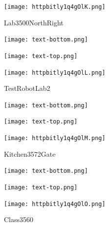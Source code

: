 \documentclass[letterpaper]{article}
\begin{document}
 \begingroup 
 \centerline{\texttt{[image: httpbitly1q4gOlK.png]}} 
 \endgroup 
 \vspace*{\fill} 

 \hfill{\small Lab3500NorthRight} 

  \vspace{0.7in} 
 
 \centerline{\texttt{[image: text-bottom.png]}} 
 
 \pagebreak 
{} 
 \vspace*{\fill} 
 
  \centerline{\texttt{[image: text-top.png]}} 
 
 \vspace{0.5in} 
 
 \begingroup 
 \centerline{\texttt{[image: httpbitly1q4gOlL.png]}} 
 \endgroup 
 \vspace*{\fill} 

 \hfill{\small TestRobotLab2} 

  \vspace{0.7in} 
 
 \centerline{\texttt{[image: text-bottom.png]}} 
 
 \pagebreak 
{} 
 \vspace*{\fill} 
 
  \centerline{\texttt{[image: text-top.png]}} 
 
 \vspace{0.5in} 
 
 \begingroup 
 \centerline{\texttt{[image: httpbitly1q4gOlM.png]}} 
 \endgroup 
 \vspace*{\fill} 

 \hfill{\small Kitchen3572Gate} 

  \vspace{0.7in} 
 
 \centerline{\texttt{[image: text-bottom.png]}} 
 
 \pagebreak 
{} 
 \vspace*{\fill} 
 
  \centerline{\texttt{[image: text-top.png]}} 
 
 \vspace{0.5in} 
 
 \begingroup 
 \centerline{\texttt{[image: httpbitly1q4gOlO.png]}} 
 \endgroup 
 \vspace*{\fill} 

 \hfill{\small Class3560} 

  \vspace{0.7in} 
 
\end{document}
